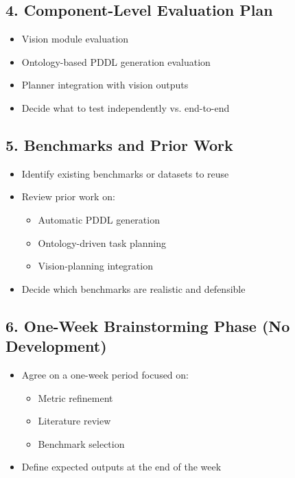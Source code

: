 \documentclass[12pt]{article}
\begin{document}
\subsection*{4. Component-Level Evaluation Plan}
\begin{itemize}
    \item Vision module evaluation
    \item Ontology-based PDDL generation evaluation
    \item Planner integration with vision outputs
    \item Decide what to test independently vs. end-to-end
\end{itemize}

\subsection*{5. Benchmarks and Prior Work}
\begin{itemize}
    \item Identify existing benchmarks or datasets to reuse
    \item Review prior work on:
    \begin{itemize}
        \item Automatic PDDL generation
        \item Ontology-driven task planning
        \item Vision-planning integration
    \end{itemize}
    \item Decide which benchmarks are realistic and defensible
\end{itemize}

\subsection*{6. One-Week Brainstorming Phase (No Development)}
\begin{itemize}
    \item Agree on a one-week period focused on:
    \begin{itemize}
        \item Metric refinement
        \item Literature review
        \item Benchmark selection
    \end{itemize}
    \item Define expected outputs at the end of the week
\end{itemize}
\end{document}
